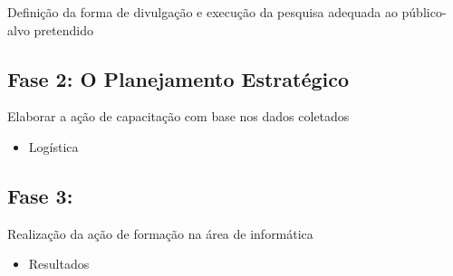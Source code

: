 \documentclass[12pt]{article}
\begin{document}
    Definição da forma de divulgação e execução da pesquisa adequada ao 
    público-alvo pretendido

    \subsection{Fase 2: O Planejamento Estratégico}
    Elaborar a ação de capacitação com base nos dados coletados
    \begin{itemize}[label=--]
        \item Logística 
    \end{itemize}

    \subsection{Fase 3:}
    Realização da ação de formação na área de informática

    \begin{itemize}[label=--]
        \item Resultados
    \end{itemize}
\end{document}
